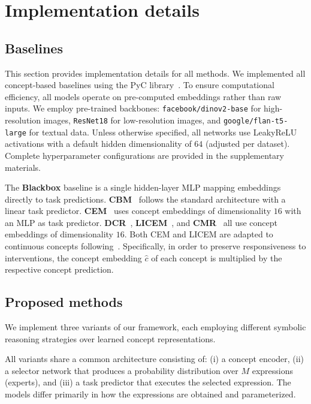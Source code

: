 \documentclass{article}
\theoremstyle{plain}
\theoremstyle{definition}
\theoremstyle{remark}
\begin{document}
\section{Implementation details}
\label{app:implementation_details}
\subsection{Baselines}
\label{app:baselines}

This section provides implementation details for all methods. We implemented all concept-based baselines using the PyC library~\citep{pycteam2025concept}. To ensure computational efficiency, all models operate on pre-computed embeddings rather than raw inputs. We employ pre-trained backbones: \texttt{facebook/dinov2-base} for high-resolution images, \texttt{ResNet18} for low-resolution images, and \texttt{google/flan-t5-large} for textual data. Unless otherwise specified, all networks use LeakyReLU activations with a default hidden dimensionality of $64$ (adjusted per dataset). Complete hyperparameter configurations are provided in the supplementary materials.

The \textbf{Blackbox} baseline is a single hidden-layer MLP mapping embeddings directly to task predictions. \textbf{CBM}~\citep{koh2020concept} follows the standard architecture with a linear task predictor. \textbf{CEM}~\citep{zarlenga2022concept} uses concept embeddings of dimensionality $16$ with an MLP as task predictor. \textbf{DCR}~\citep{barbiero2023}, \textbf{LICEM}~\citep{de2025}, and \textbf{CMR}~\citep{debot2024interpretable} all use concept embeddings of dimensionality $16$. Both CEM and LICEM are adapted to continuous concepts following~\citet{ismail2024concept}. Specifically, in order to preserve responsiveness to interventions, the concept embedding $\hat{c}$ of each concept is multiplied by the respective concept prediction.


\subsection{Proposed methods}
\label{app:proposed_methods}

We implement three variants of our \classacro{} framework, each employing different symbolic reasoning strategies over learned concept representations.

All variants share a common architecture consisting of: (i) a concept encoder, (ii) a selector network that produces a probability distribution over $M$ expressions (experts), and (iii) a task predictor that executes the selected expression. The models differ primarily in how the expressions are obtained and parameterized.
\end{document}
